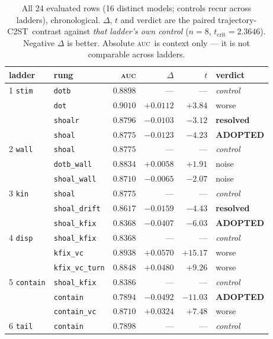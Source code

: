\documentclass[11pt,a4paper]{article}
\newcommand{\win}[1]{\textcolor{winc}{\textbf{#1}}}
\newcommand{\lose}[1]{\textcolor{losec}{#1}}
\newcommand{\nul}[1]{\textcolor{nullc}{#1}}
\newcommand{\auc}{\textsc{auc}}
\newcommand{\ctst}{C2ST}
\newcommand{\code}[1]{\texttt{\small #1}}
\begin{document}
\begin{table}[h]\centering\small
\caption{All 24 evaluated rows (16 distinct models; controls recur across ladders), chronological. $\Delta$, $t$ and verdict are the
paired trajectory-\ctst\ contrast against \emph{that ladder's own control}
($n=8$, $t_{\mathrm{crit}} = 2.3646$). Negative $\Delta$ is better. Absolute \auc\ is
context only --- it is not comparable across ladders.}
\begin{tabular}{llrrrl}
\toprule
\textbf{ladder} & \textbf{rung} & \textbf{\auc} & \textbf{$\Delta$} & \textbf{$t$} & \textbf{verdict} \\
\midrule
1 \code{stim} & \code{dotb} & $0.8898$ & --- & --- & \textit{control} \\
 & \code{dot} & $0.9010$ & $+0.0112$ & $+3.84$ & \lose{worse} \\
 & \code{shoalr} & $0.8796$ & $-0.0103$ & $-3.12$ & \win{resolved} \\
 & \code{shoal} & $0.8775$ & $-0.0123$ & $-4.23$ & \win{ADOPTED} \\
\midrule
2 \code{wall} & \code{shoal} & $0.8775$ & --- & --- & \textit{control} \\
 & \code{dotb\_wall} & $0.8834$ & $+0.0058$ & $+1.91$ & \nul{noise} \\
 & \code{shoal\_wall} & $0.8710$ & $-0.0065$ & $-2.07$ & \nul{noise} \\
\midrule
3 \code{kin} & \code{shoal} & $0.8775$ & --- & --- & \textit{control} \\
 & \code{shoal\_drift} & $0.8617$ & $-0.0159$ & $-4.43$ & \win{resolved} \\
 & \code{shoal\_kfix} & $0.8368$ & $-0.0407$ & $-6.03$ & \win{ADOPTED} \\
\midrule
4 \code{disp} & \code{shoal\_kfix} & $0.8368$ & --- & --- & \textit{control} \\
 & \code{kfix\_vc} & $0.8938$ & $+0.0570$ & $+15.17$ & \lose{worse} \\
 & \code{kfix\_vc\_turn} & $0.8848$ & $+0.0480$ & $+9.26$ & \lose{worse} \\
\midrule
5 \code{contain} & \code{shoal\_kfix} & $0.8386$ & --- & --- & \textit{control} \\
 & \code{contain} & $0.7894$ & $-0.0492$ & $-11.03$ & \win{ADOPTED} \\
 & \code{contain\_vc} & $0.8710$ & $+0.0324$ & $+7.48$ & \lose{worse} \\
\midrule
6 \code{tail} & \code{contain} & $0.7898$ & --- & --- & \textit{control} \\

\end{tabular}
\end{table}
\end{document}
